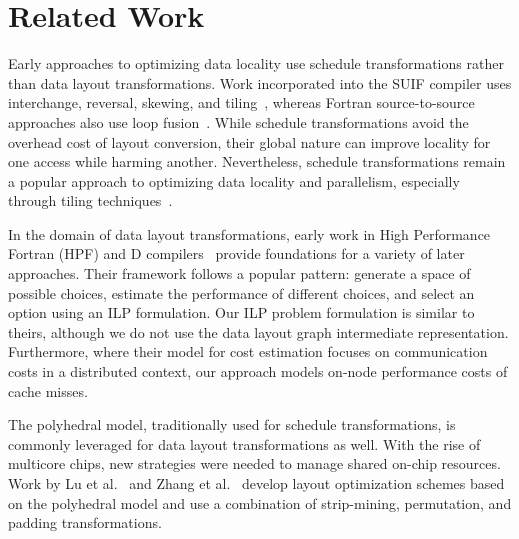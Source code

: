 \documentclass[sigconf,review=true]{acmart}
\begin{document}
\section{Related Work}

Early approaches to optimizing data locality use schedule transformations rather than data layout transformations. 
Work incorporated into the SUIF compiler uses interchange, reversal, skewing, and tiling~\cite{wolf1991data}, whereas Fortran source-to-source approaches also use loop fusion~\cite{mckinley1996improving}.
While schedule transformations avoid the overhead cost of layout conversion, their global nature can improve locality for one access while harming another.
Nevertheless, schedule transformations remain a popular approach to optimizing data locality and parallelism, 
especially through tiling techniques~\cite{bondhugula2008pluto,bertolacci2015parameterized,bondhugula2016diamond,bandishti2012tiling,unat2016tida}.

In the domain of data layout transformations, early work in High Performance Fortran (HPF) and D compilers~\cite{bixby1994automatic,kennedy1995automatic,kennedy1998automatic} provide foundations for a variety of later approaches.
Their framework follows a popular pattern: generate a space of possible choices, estimate the performance of different choices, and select an option using an ILP formulation. 
Our ILP problem formulation is similar to theirs, although we do not use the data layout graph intermediate representation.
Furthermore, where their model for cost estimation focuses on communication costs in a distributed context, our approach models on-node performance costs of cache misses.

The polyhedral model, traditionally used for schedule transformations, is commonly leveraged for data layout transformations as well.
With the rise of multicore chips, new strategies were needed to manage shared on-chip resources. 
Work by Lu et al.~\cite{lu2009data} and Zhang et al.~\cite{zhang2011optimizing} develop layout optimization schemes based on the polyhedral model and use a combination of strip-mining, permutation, and padding transformations.
\end{document}
